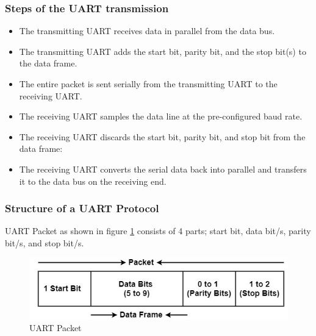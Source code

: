 \subsubsection{Steps of the UART transmission}
\begin{itemize}
    \item The transmitting UART receives data in parallel from the data bus.
    \item The transmitting UART adds the start bit, parity bit, and the stop bit(s) to the data frame.
    \item The entire packet is sent serially from the transmitting UART to the receiving UART. 
    \item The receiving UART samples the data line at the pre-configured baud rate.
    \item The receiving UART discards the start bit, parity bit, and stop bit from the data frame:
    \item The receiving UART converts the serial data back into parallel and transfers it to the data bus on the receiving end.
\end{itemize}
\clearpage
\subsubsection{Structure of a UART Protocol}
UART Packet as shown in figure \ref{fig:UART-packet} consists of 4 parts; start bit, data bit/s, parity bit/s, and stop bit/s.
\begin{figure}[h]
\includegraphics[width=\textwidth]{figure/3_2.jpg}
\caption{UART Packet}
\label{fig:UART-packet}
\centering
\end{figure}

